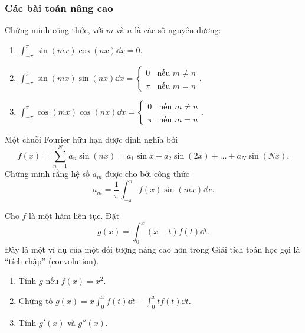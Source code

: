 \subsubsection{Các bài toán nâng cao}
\begin{exercise}
    Chứng minh công thức, với $m$ và $n$ là các số nguyên dương:
    \begin{enumerate}[label=(\alph*)]
        \item $\int_{-\pi}^{\pi} \sin(mx) \cos(nx) \dd x = 0.$
        \item $\int_{-\pi}^{\pi} \sin(mx) \sin(nx) \dd x = \begin{cases} 0 & \text{nếu } m \neq n \\ \pi & \text{nếu } m = n \end{cases}.$
        \item $\int_{-\pi}^{\pi} \cos(mx) \cos(nx) \dd x = \begin{cases} 0 & \text{nếu } m \neq n \\ \pi & \text{nếu } m = n \end{cases}.$
    \end{enumerate}
\end{exercise}

\begin{exercise}
    Một chuỗi Fourier hữu hạn được định nghĩa bởi
    \[ f(x) = \sum_{n=1}^N a_n \sin(nx) = a_1 \sin x + a_2 \sin(2x) + \dots + a_N \sin(Nx). \]
    Chứng minh rằng hệ số $a_m$ được cho bởi công thức
    \[ a_m = \dfrac{1}{\pi} \int_{-\pi}^{\pi} f(x) \sin(mx) \dd x. \]
\end{exercise}

\begin{exercise}
    Cho $f$ là một hàm liên tục. Đặt
    \[ g(x) = \int_0^x (x-t)f(t) \dd t. \]
    Đây là một ví dụ của một đối tượng nâng cao hơn trong Giải tích toán học gọi là ``tích chập'' (convolution).
    \begin{enumerate}[label=(\alph*)]
        \item Tính $g$ nếu $f(x) = x^2$.
        \item Chứng tỏ $g(x) = x\int_0^x f(t)\dd t - \int_0^x tf(t) \dd t.$
        \item Tính $g'(x)$ và $g''(x)$.
    \end{enumerate}
\end{exercise}